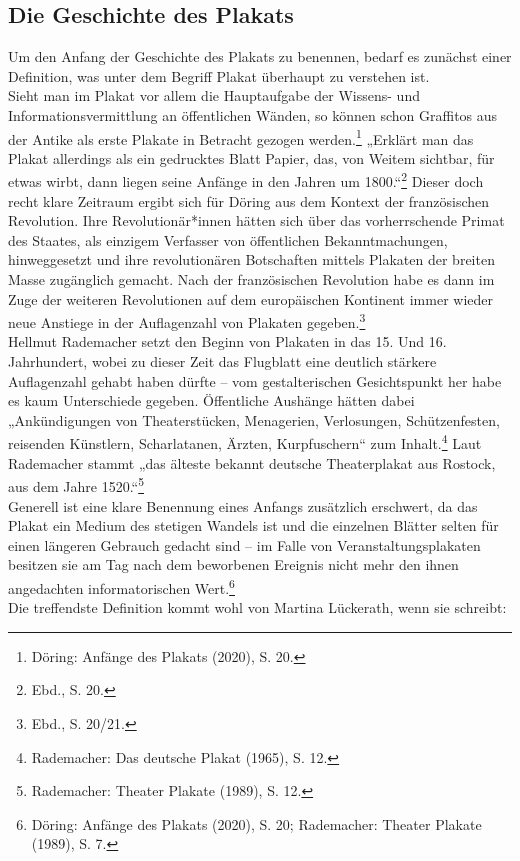\documentclass[a4paper,12pt,ngerman]{article}
\begin{document}
\subsection{Die Geschichte des Plakats}
Um den Anfang der Geschichte des Plakats zu benennen, bedarf es zunächst einer Definition, was unter dem Begriff Plakat überhaupt zu verstehen ist. \\
Sieht man im Plakat vor allem die Hauptaufgabe der Wissens- und Informationsvermittlung an öffentlichen Wänden, so können schon Graffitos aus der Antike als erste Plakate in Betracht gezogen werden.\footnote{Döring: Anfänge des Plakats (2020), S. 20.}  „Erklärt man das Plakat allerdings als ein gedrucktes Blatt Papier, das, von Weitem sichtbar, für etwas wirbt, dann liegen seine Anfänge in den Jahren um 1800.“\footnote{Ebd., S. 20.}  Dieser doch recht klare Zeitraum ergibt sich für Döring aus dem Kontext der französischen Revolution. Ihre Revolutionär*innen hätten sich über das vorherrschende Primat des Staates, als einzigem Verfasser von öffentlichen Bekanntmachungen, hinweggesetzt und ihre revolutionären Botschaften mittels Plakaten der breiten Masse zugänglich gemacht. Nach der französischen Revolution habe es dann im Zuge der weiteren Revolutionen auf dem europäischen Kontinent immer wieder neue Anstiege in der Auflagenzahl von Plakaten gegeben.\footnote{Ebd., S. 20/21.} \\
Hellmut Rademacher setzt den Beginn von Plakaten in das 15. Und 16. Jahrhundert, wobei zu dieser Zeit das Flugblatt eine deutlich stärkere Auflagenzahl gehabt haben dürfte -- vom gestalterischen Gesichtspunkt her habe es kaum Unterschiede gegeben. Öffentliche Aushänge hätten dabei „Ankündigungen von Theaterstücken, Menagerien, Verlosungen, Schützenfesten, reisenden Künstlern, Scharlatanen, Ärzten, Kurpfuschern“ zum Inhalt.\footnote{Rademacher: Das deutsche Plakat (1965), S. 12.}  Laut Rademacher stammt „das älteste bekannt deutsche Theaterplakat aus Rostock, aus dem Jahre 1520.“\footnote{Rademacher: Theater Plakate (1989), S. 12.} \\
Generell ist eine klare Benennung eines Anfangs zusätzlich erschwert, da das Plakat ein Medium des stetigen Wandels ist und die einzelnen Blätter selten für einen längeren Gebrauch gedacht sind -- im Falle von Veranstaltungsplakaten besitzen sie am Tag nach dem beworbenen Ereignis nicht mehr den ihnen angedachten informatorischen Wert.\footnote{Döring: Anfänge des Plakats (2020), S. 20; Rademacher: Theater Plakate (1989), S. 7.} \\
Die treffendste Definition kommt wohl von Martina Lückerath, wenn sie schreibt:
\end{document}
